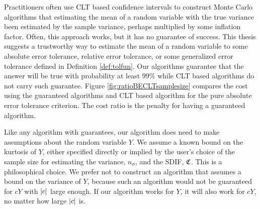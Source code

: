 \documentclass{iitthesis}
\theoremstyle{definition}
\begin{document}
Practitioners often use CLT based confidence intervals to construct Monte Carlo algorithms that estimating the mean of a random variable with the true variance been estimated by the sample variance, perhaps multiplied by some inflation factor. Often, this approach works, but it has no guarantee of success. This thesis suggests a trustworthy way to estimate the mean of a random variable to some absolute error tolerance, relative error tolerance, or some generalized error tolerance defined in Definition \ref{def:tolfun}. Our algorithms guarantee that the answer will be true with probability at least $99\%$ while CLT based algorithms do not carry such guarantee.  Figure \ref{fig:ratioBECLTsamplesize} compares the cost using the guaranteed algorithms and CLT based algorithm for the pure absolute error tolerance criterion. The cost ratio is the penalty for having a guaranteed algorithm.
%
%
%
%
%
%
%
%

Like any algorithm with guarantees, our algorithm does need to make assumptions about the random variable $Y$.  We assume a known bound on the kurtosis of $Y$, either specified directly or implied by the user's choice of the sample size for estimating the variance, $n_\sigma$, and the SDIF, $\mathfrak{C}$.  This is a philosophical choice.  We prefer not to construct an algorithm that assumes a bound on the variance of $Y$, because such an algorithm would not be guaranteed for $cY$ with $\left \lvert c \right \rvert$ large enough.  If our algorithm works for $Y$, it will also work for $cY$, no matter how large $\left \lvert c \right \rvert$ is. 
\end{document}
